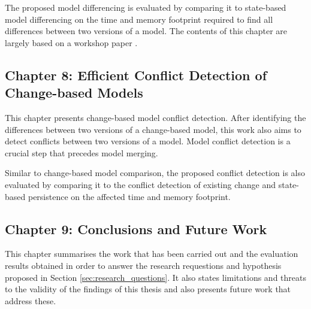 The proposed model differencing is evaluated by comparing it to state-based model differencing on the time and memory footprint required to find all differences between two versions of a model. The contents of this chapter are largely based on a workshop paper \cite{yohannis2019efficient}.

\subsection{Chapter 8: Efficient Conflict Detection of Change-based Models}
\label{sec:chapter_7_conflict_detection}
This chapter presents change-based model conflict detection. After identifying the differences between two versions of a change-based model, this work also aims to detect conflicts between two versions of a model. Model conflict detection is a crucial step that precedes model merging.

Similar to change-based model comparison, the proposed conflict detection is also evaluated by comparing it to the conflict detection of existing change and state-based persistence on the affected time and memory footprint.

\subsection{Chapter 9: Conclusions and Future Work}
\label{sec:chapter_8_conclusions_and_future_work}
This chapter summarises the work that has been carried out and the evaluation results obtained in order to answer the research requestions and hypothesis proposed in Section \ref{sec:research_questions}. It also states limitations and threats to the validity of the findings of this thesis and also presents future work that address these.

